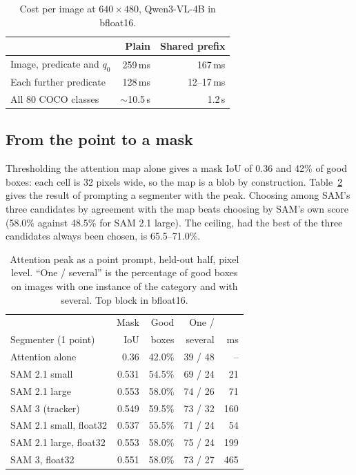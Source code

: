 \documentclass[10pt,twocolumn]{article}
\begin{document}
\begin{table}[t]
\centering\small
\begin{tabular}{lrr}
\toprule
 & Plain & Shared prefix \\
\midrule
Image, predicate and $q_0$ & 259\,ms & 167\,ms \\
Each further predicate & 128\,ms & 12--17\,ms \\
All 80 COCO classes & $\sim$10.5\,s & 1.2\,s \\
\bottomrule
\end{tabular}
\caption{Cost per image at $640\times480$, Qwen3-VL-4B in bfloat16.}
\label{tab:prefix}
\end{table}

\subsection{From the point to a mask}
\label{sec:mask}

Thresholding the attention map alone gives a mask IoU of 0.36 and 42\% of good
boxes: each cell is 32 pixels wide, so the map is a blob by construction.
Table~\ref{tab:sam} gives the result of prompting a segmenter with the peak.
Choosing among SAM's three candidates by agreement with the map beats choosing
by SAM's own score (58.0\% against 48.5\% for SAM 2.1 large). The ceiling, had
the best of the three candidates always been chosen, is 65.5--71.0\%.

\begin{table}[t]
\centering\small
\setlength{\tabcolsep}{3.5pt}
\begin{tabular}{lrrrr}
\toprule
 & Mask & Good & One / & \\
Segmenter (1 point) & IoU & boxes & several & ms \\
\midrule
Attention alone & 0.36 & 42.0\% & 39 / 48 & -- \\
SAM 2.1 small & 0.531 & 54.5\% & 69 / 24 & 21 \\
SAM 2.1 large & 0.553 & 58.0\% & 74 / 26 & 71 \\
SAM 3 (tracker) & 0.549 & 59.5\% & 73 / 32 & 160 \\
\midrule
SAM 2.1 small, float32 & 0.537 & 55.5\% & 71 / 24 & 54 \\
SAM 2.1 large, float32 & 0.553 & 58.0\% & 75 / 24 & 199 \\
SAM 3, float32 & 0.551 & 58.0\% & 73 / 27 & 465 \\
\bottomrule
\end{tabular}
\caption{Attention peak as a point prompt, held-out half, pixel level.
``One / several'' is the percentage of good boxes on images with one instance
of the category and with several. Top block in bfloat16.}
\label{tab:sam}
\end{table}
\end{document}
